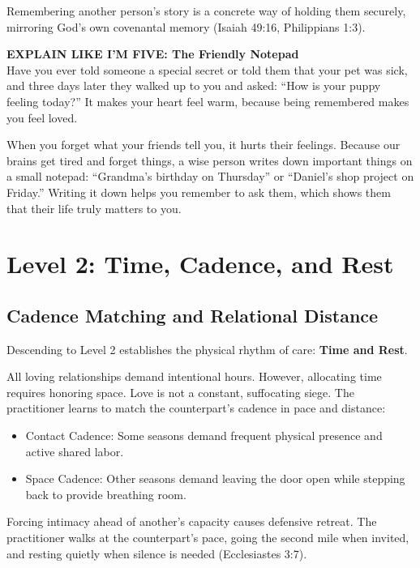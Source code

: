 \documentclass[11pt,twocolumn]{article}
\begin{document}
Remembering another person's story is a concrete way of holding them securely, mirroring God's own covenantal memory (Isaiah 49:16, Philippians 1:3).

\begin{eli5box}
\textbf{EXPLAIN LIKE I'M FIVE: The Friendly Notepad}\\
Have you ever told someone a special secret or told them that your pet was sick, and three days later they walked up to you and asked: ``How is your puppy feeling today?'' It makes your heart feel warm, because being remembered makes you feel loved. 

When you forget what your friends tell you, it hurts their feelings. Because our brains get tired and forget things, a wise person writes down important things on a small notepad: ``Grandma's birthday on Thursday'' or ``Daniel's shop project on Friday.'' Writing it down helps you remember to ask them, which shows them that their life truly matters to you.
\end{eli5box}

\section{Level 2: Time, Cadence, and Rest}

\subsection{Cadence Matching and Relational Distance}
Descending to Level 2 establishes the physical rhythm of care: \textbf{Time and Rest}.

All loving relationships demand intentional hours. However, allocating time requires honoring space. Love is not a constant, suffocating siege. The practitioner learns to match the counterpart's cadence in pace and distance:
\begin{itemize}
    \item Contact Cadence: Some seasons demand frequent physical presence and active shared labor.
    \item Space Cadence: Other seasons demand leaving the door open while stepping back to provide breathing room.
\end{itemize}

Forcing intimacy ahead of another's capacity causes defensive retreat. The practitioner walks at the counterpart's pace, going the second mile when invited, and resting quietly when silence is needed (Ecclesiastes 3:7).
\end{document}
